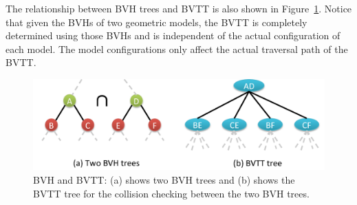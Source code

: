 The relationship between BVH trees and BVTT is also shown in Figure~\ref{fig:5:BVTT}. Notice that given the BVHs
of two geometric models, the BVTT is completely determined using those BVHs and is independent of the actual configuration of
each model. The model configurations only affect the actual traversal path of the BVTT.

\begin{figure}[!h]
  \centering
  \includegraphics[width=\linewidth]{figs/5/BVTT.pdf}
  \caption[Illustrations of BVH and BVTT]{BVH and BVTT: (a) shows two BVH trees and (b) shows the BVTT tree for the collision checking between the two BVH trees.}
  \label{fig:5:BVTT}
\end{figure}

